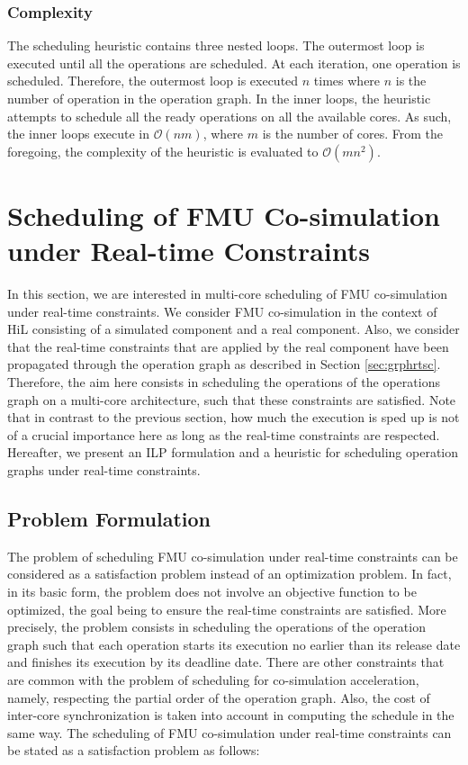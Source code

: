 \subsubsection{Complexity}

The scheduling heuristic contains three nested loops. The outermost loop is executed until all the operations are scheduled. At each iteration, one operation is scheduled. Therefore, the outermost loop is executed $n$ times where $n$ is the number of operation in the operation graph. In the inner loops, the heuristic attempts to schedule all the ready operations on all the available cores. As such, the inner loops execute in $\mathcal{O}(nm)$, where $m$ is the number of cores. From the foregoing, the complexity of the heuristic is evaluated to $\mathcal{O}(mn^2)$.

\section{Scheduling of FMU Co-simulation under Real-time Constraints}

In this section, we are interested in multi-core scheduling of FMU co-simulation under real-time constraints. We consider FMU co-simulation in the context of HiL consisting of a simulated component and a real component. Also, we consider that the real-time constraints that are applied by the real component have been propagated through the operation graph as described in Section \ref{sec:grphrtsc}. Therefore, the aim here consists in scheduling the operations of the operations graph on a multi-core architecture, such that these constraints are satisfied. Note that in contrast to the previous section, how much the execution is sped up is not of a crucial importance here as long as the real-time constraints are respected. Hereafter, we present an ILP formulation and a heuristic for scheduling operation graphs under real-time constraints.

\subsection{Problem Formulation}

The problem of scheduling FMU co-simulation under real-time constraints can be considered as a satisfaction problem instead of an optimization problem. In fact, in its basic form, the problem does not involve an objective function to be optimized, the goal being to ensure the real-time constraints are satisfied. More precisely, the problem consists in scheduling the operations of the operation graph such that each operation starts its execution no earlier than its release date and finishes its execution by its deadline date. There are other constraints that are common with the problem of scheduling for co-simulation acceleration, namely, respecting the partial order of the operation graph. Also, the cost of inter-core synchronization is taken into account in computing the schedule in the same way. The scheduling of FMU co-simulation under real-time constraints can be stated as a satisfaction problem as follows:

